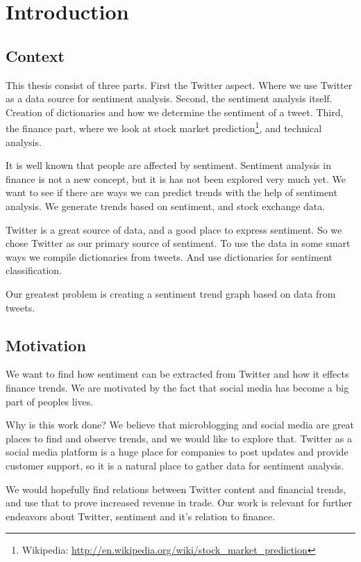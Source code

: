 \chapter{Introduction}\label{introduction}

\section{Context}
This thesis consist of three parts. First the Twitter aspect. Where we use
Twitter as a data source for sentiment analysis. Second, the sentiment analysis
itself. Creation of dictionaries and how we determine the sentiment of a
tweet. Third, the finance part, where we look at stock market
prediction\footnote{Wikipedia:
\url{http://en.wikipedia.org/wiki/stock_market_prediction}}, and technical
analysis.  

It is well known that people are affected by sentiment. Sentiment analysis in
finance is not a new concept, but it is has not been explored very much yet.
We want to see if there are ways we can predict trends with the help of
sentiment analysis. We generate trends based on sentiment, and stock exchange
data.  

Twitter is a great source of data, and a
good place to express sentiment. So we chose Twitter as our primary source of
sentiment. To use the data in some smart ways we compile dictionaries from
tweets. And use dictionaries for sentiment classification. 

Our greatest problem is creating a sentiment trend graph based on data from
tweets. 
%

\section{Motivation}
We want to find how sentiment can be extracted from Twitter and
how it effects finance trends. We are motivated by the fact that social media
has become a big part of peoples lives. 

Why is this work done? We believe that microblogging and social media are great
places to find and observe trends, and we would like to explore that. Twitter as
a social media platform is a huge place for companies to post updates and
provide customer support, so it is a natural place to gather data for sentiment
analysis.

We would hopefully find relations between Twitter content and financial trends,
and use that to prove increased revenue in trade. Our work is relevant for
further endeavors about Twitter, sentiment and it's relation to finance.  

